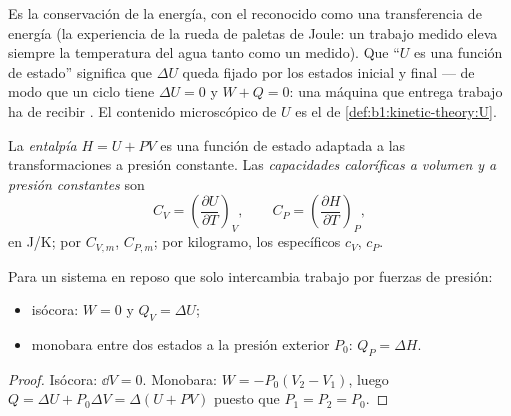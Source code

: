 \begin{remark}\label{rem:b1:first-law:meaning}
Es la conservación de la energía, con el  reconocido como una
transferencia de energía (la experiencia de la rueda de paletas de Joule:
un trabajo medido eleva siempre la temperatura del agua tanto como un
 medido). Que ``$U$ es una función de estado'' significa que
$\Delta U$ queda fijado por los estados inicial y final --- de modo que un
ciclo tiene $\Delta U = 0$ y $W + Q = 0$: una máquina que entrega trabajo
ha de recibir . El contenido microscópico de $U$ es el de
\cref{def:b1:kinetic-theory:U}.
\end{remark}

\begin{definition}\label{def:b1:first-law:enthalpy}
La \emph{entalpía} $H = U + PV$ es una función de estado adaptada a las
transformaciones a presión constante. Las \emph{capacidades caloríficas a
volumen y a presión constantes} son
\[
C_V = \left(\frac{\partial U}{\partial T}\right)_V, \qquad
C_P = \left(\frac{\partial H}{\partial T}\right)_P ,
\]
en \unit{J/K}; por  $C_{V,m}$, $C_{P,m}$; por kilogramo, los 
específicos $c_V$, $c_P$.
\end{definition}

\begin{proposition}\label{prop:b1:first-law:qvqp}
Para un sistema en reposo que solo intercambia trabajo por fuerzas de presión:
\begin{itemize}
  \item {} isócora: $W = 0$ y $Q_V = \Delta U$;
  \item {} monobara entre dos estados a la presión exterior
        $P_0$: $Q_P = \Delta H$.
\end{itemize}
\end{proposition}

\begin{proof}
Isócora: $\dd V = 0$. Monobara: $W = -P_0(V_2 - V_1)$, luego $Q = \Delta U +
P_0\Delta V = \Delta(U + PV)$ puesto que $P_1 = P_2 = P_0$.
\end{proof}

